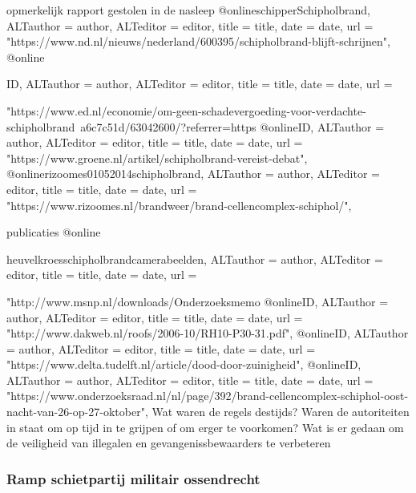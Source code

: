 {{{{{{{opmerkelijk rapport gestolen in de nasleep
@online{schipperSchipholbrand,	ALTauthor = {author},	ALTeditor = {editor},	title = {title},	date = {date},	url = {"https://www.nd.nl/nieuws/nederland/600395/schipholbrand-blijft-schrijnen"},}
@online{ID,	ALTauthor = {author},	ALTeditor = {editor},	title = {title},	date = {date},	url = {"https://www.ed.nl/economie/om-geen-schadevergoeding-voor-verdachte-schipholbrand~a6c7c51d/63042600/?referrer=https%
@online{ID,	ALTauthor = {author},	ALTeditor = {editor},	title = {title},	date = {date},	url = {"https://www.groene.nl/artikel/schipholbrand-vereist-debat"},}
@online{rizoomes01052014schipholbrand,	ALTauthor = {author},	ALTeditor = {editor},	title = {title},	date = {date},	url = {"https://www.rizoomes.nl/brandweer/brand-cellencomplex-schiphol/"},}



publicaties
@online{heuvelkroesschipholbrandcamerabeelden,	ALTauthor = {author},	ALTeditor = {editor},	title = {title},	date = {date},	url = {"http://www.msnp.nl/downloads/Onderzoeksmemo%
@online{ID,	ALTauthor = {author},	ALTeditor = {editor},	title = {title},	date = {date},	url = {"http://www.dakweb.nl/roofs/2006-10/RH10-P30-31.pdf"},}
@online{ID,	ALTauthor = {author},	ALTeditor = {editor},	title = {title},	date = {date},	url = {"https://www.delta.tudelft.nl/article/dood-door-zuinigheid"},}
@online{ID,	ALTauthor = {author},	ALTeditor = {editor},	title = {title},	date = {date},	url = {"https://www.onderzoeksraad.nl/nl/page/392/brand-cellencomplex-schiphol-oost-nacht-van-26-op-27-oktober"},}
Wat waren de regels destijds?
Waren de autoriteiten in staat om op tijd in te grijpen of om erger te voorkomen?
Wat is er gedaan om de veiligheid van illegalen en gevangenissbewaarders te verbeteren

\subsubsection{Ramp schietpartij militair ossendrecht }

}}}}}}}}}}}
